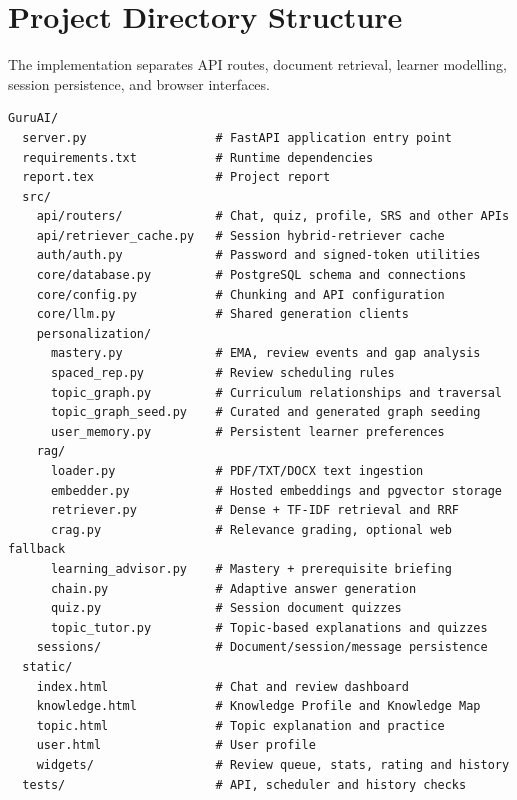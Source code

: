 \documentclass[11pt, a4paper, oneside]{report}
\begin{document}
\chapter{Project Directory Structure}
The implementation separates API routes, document retrieval, learner modelling, session persistence, and browser interfaces.
\begin{verbatim}
GuruAI/
  server.py                  # FastAPI application entry point
  requirements.txt           # Runtime dependencies
  report.tex                 # Project report
  src/
    api/routers/             # Chat, quiz, profile, SRS and other APIs
    api/retriever_cache.py   # Session hybrid-retriever cache
    auth/auth.py             # Password and signed-token utilities
    core/database.py         # PostgreSQL schema and connections
    core/config.py           # Chunking and API configuration
    core/llm.py              # Shared generation clients
    personalization/
      mastery.py             # EMA, review events and gap analysis
      spaced_rep.py          # Review scheduling rules
      topic_graph.py         # Curriculum relationships and traversal
      topic_graph_seed.py    # Curated and generated graph seeding
      user_memory.py         # Persistent learner preferences
    rag/
      loader.py              # PDF/TXT/DOCX text ingestion
      embedder.py            # Hosted embeddings and pgvector storage
      retriever.py           # Dense + TF-IDF retrieval and RRF
      crag.py                # Relevance grading, optional web fallback
      learning_advisor.py    # Mastery + prerequisite briefing
      chain.py               # Adaptive answer generation
      quiz.py                # Session document quizzes
      topic_tutor.py         # Topic-based explanations and quizzes
    sessions/                # Document/session/message persistence
  static/
    index.html               # Chat and review dashboard
    knowledge.html           # Knowledge Profile and Knowledge Map
    topic.html               # Topic explanation and practice
    user.html                # User profile
    widgets/                 # Review queue, stats, rating and history
  tests/                     # API, scheduler and history checks
\end{verbatim}
\end{document}
